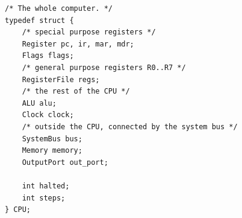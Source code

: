 \begin{lstlisting}[style=csrc]
/* The whole computer. */
typedef struct {
    /* special purpose registers */
    Register pc, ir, mar, mdr;
    Flags flags;
    /* general purpose registers R0..R7 */
    RegisterFile regs;
    /* the rest of the CPU */
    ALU alu;
    Clock clock;
    /* outside the CPU, connected by the system bus */
    SystemBus bus;
    Memory memory;
    OutputPort out_port;

    int halted;
    int steps;
} CPU;
\end{lstlisting}
